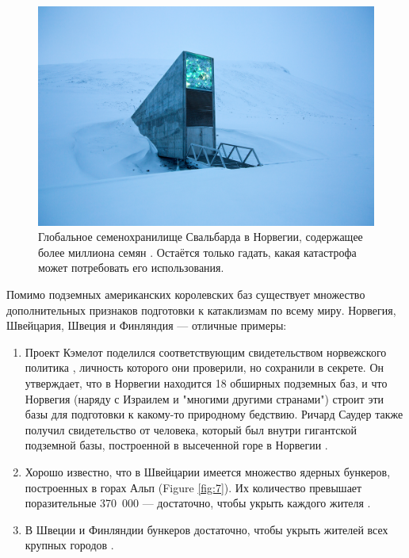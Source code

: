 \documentclass[10pt,twocolumn,letterpaper]{article}
\begin{document}
\begin{figure}[t]
\begin{center}
   \includegraphics[width=1\linewidth]{svalbard.jpg}

\end{center}
   \caption{Глобальное семенохранилище Свальбарда в Норвегии, содержащее более миллиона семян \cite{24}. Остаётся только гадать, какая катастрофа может потребовать его использования.}
\label{fig:8}
\label{fig:onecol}
\end{figure}

Помимо подземных американских королевских баз существует множество дополнительных признаков подготовки к катаклизмам по всему миру. Норвегия, Швейцария, Швеция и Финляндия — отличные примеры:

\begin{flushleft}
\begin{enumerate}
    \item Проект Кэмелот поделился соответствующим свидетельством норвежского политика \cite{25,26}, личность которого они проверили, но сохранили в секрете. Он утверждает, что в Норвегии находится 18 обширных подземных баз, и что Норвегия (наряду с Израилем и "многими другими странами") строит эти базы для подготовки к какому-то природному бедствию. Ричард Саудер также получил свидетельство от человека, который был внутри гигантской подземной базы, построенной в высеченной горе в Норвегии \cite{22}.
    \item Хорошо известно, что в Швейцарии имеется множество ядерных бункеров, построенных в горах Альп (Figure \ref{fig:7}). Их количество превышает поразительные 370~000 — достаточно, чтобы укрыть каждого жителя \cite{27}.
    \item В Швеции и Финляндии бункеров достаточно, чтобы укрыть жителей всех крупных городов \cite{27}. 
\end{enumerate}
\end{flushleft}
\end{document}
